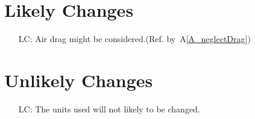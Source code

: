 \documentclass[12pt]{article}
\newcommand{\aref}[1]{A\ref{#1}}
\newcounter{lcnum} %
\begin{document}
\section{Likely Changes}\label{sec_likelyChanges}
\noindent \begin{itemize}

\item[LC\refstepcounter{lcnum}\thelcnum\label{LC_airdrag}:] Air drag might be considered.(Ref. by~\aref{A_neglectDrag})

\end{itemize}

\section{Unlikely Changes}\label{sec_unlikelyChanges}
\noindent \begin{itemize}

\item[LC\refstepcounter{lcnum}\thelcnum\label{LC_units}:] The units used will not likely to be changed.   

\end{itemize}
\end{document}
